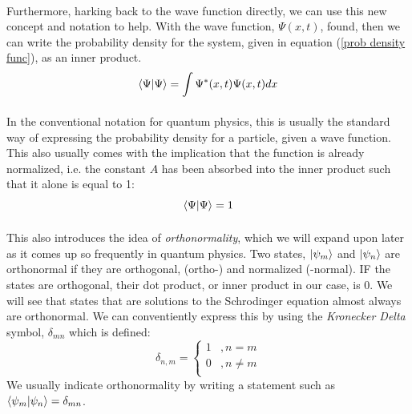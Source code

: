 \documentclass[12pt,letterpaper]{book}
\begin{document}
\paragraph*{}Furthermore, harking back to the wave function directly, we can use this new concept and notation to help. With the wave function, $\Psi(x,t)$, found, then we can write the probability density for the system, given in equation (\ref{prob density func}), as an inner product.
\begin{equation}
\label{inner prod integral}
\braket{\Psi}{\Psi} = \int \Psi^*(x,t) \Psi(x,t) dx
\end{equation}
\paragraph*{}In the conventional notation for quantum physics, this is usually the standard way of expressing the probability density for a particle, given a wave function. This also usually comes with the implication that the function is already normalized, i.e. the constant $A$ has been absorbed into the inner product such that it alone is equal to 1:
\begin{equation}
\braket{\Psi}{\Psi} = 1
\end{equation}
\paragraph*{}This also introduces the idea of \textit{orthonormality}, which we will expand upon later as it comes up so frequently in quantum physics. Two states, $\ket{\psi_m}$ and $\ket{\psi_n}$ are orthonormal if they are orthogonal, (ortho-) and normalized (-normal). IF the states are orthogonal, their dot product, or inner product in our case, is $0$. We will see that states that are solutions to the Schrodinger equation almost always are orthonormal. We can conventiently express this by using the \textit{Kronecker Delta} symbol, 
$\delta_{mn}$ which is defined:
\begin{equation}
\label{kronecker}
\delta_{n,m} = 
	\left\{
        \begin{array}{ll}
            1 	&, n = m \\
            0 	&, n \neq m \\
        \end{array}
    \right.
\end{equation}
We usually indicate orthonormality by writing a statement such as $\braket{\psi_m}{\psi_n} = \delta_{mn}$.
\end{document}
